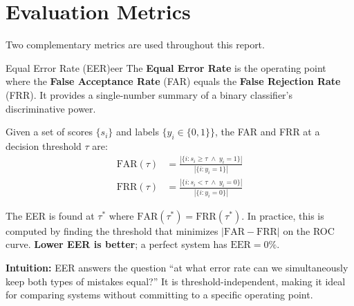 \documentclass[12pt]{report}
\begin{document}
\section{Evaluation Metrics}

Two complementary metrics are used throughout this report.

\begin{dfnbox}{Equal Error Rate (EER)}{eer}
    The \textbf{Equal Error Rate} is the operating point where the \textbf{False Acceptance Rate}
    (FAR) equals the \textbf{False Rejection Rate} (FRR). It provides a single-number summary of
    a binary classifier's discriminative power.

    Given a set of scores $\{s_i\}$ and labels $\{y_i \in \{0,1\}\}$, the FAR and FRR at a
    decision threshold $\tau$ are:
    \begin{align}
        \text{FAR}(\tau) &= \frac{|\{i : s_i \geq \tau \;\wedge\; y_i = 1\}|}{|\{i : y_i = 1\}|}
        \label{eq:far} \\[4pt]
        \text{FRR}(\tau) &= \frac{|\{i : s_i < \tau \;\wedge\; y_i = 0\}|}{|\{i : y_i = 0\}|}
        \label{eq:frr}
    \end{align}

    The EER is found at $\tau^*$ where $\text{FAR}(\tau^*) = \text{FRR}(\tau^*)$.
    In practice, this is computed by finding the threshold that minimizes $|\text{FAR} - \text{FRR}|$
    on the ROC curve. \textbf{Lower EER is better}; a perfect system has $\text{EER} = 0\%$.

    \medskip
    \textbf{Intuition:} EER answers the question ``at what error rate can we simultaneously
    keep both types of mistakes equal?'' It is threshold-independent, making it ideal for
    comparing systems without committing to a specific operating point.
\end{dfnbox}
\end{document}
